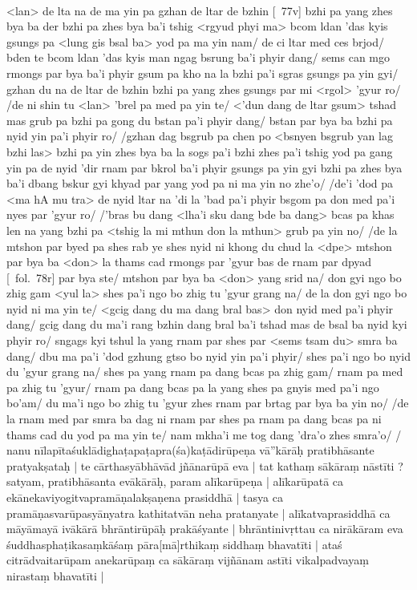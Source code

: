 \documentclass[12pt]{article}
\begin{document}
\textbf{\TVB}\\
<lan> de lta na de ma yin pa gzhan de ltar de bzhin [\TVB\ 77v] bzhi pa yang zhes bya ba der bzhi pa zhes bya ba'i tshig <rgyud phyi ma> bcom ldan 'das kyis gsungs pa <lung gis bsal ba> yod pa ma yin nam/ de ci ltar med ces brjod/ bden te bcom ldan 'das kyis man ngag bsrung ba'i phyir dang/ sems can mgo rmongs par bya ba'i phyir gsum pa kho na la bzhi pa'i sgras gsungs pa yin gyi/ gzhan du na de ltar de bzhin bzhi pa yang zhes gsungs par mi <rgol> 'gyur ro/ /de ni shin tu <lan> 'brel pa med pa yin te/ <'dun dang de ltar gsum> tshad mas grub pa bzhi pa gong du bstan pa'i phyir dang/ bstan par bya ba bzhi pa nyid yin pa'i phyir ro/ /gzhan dag bsgrub pa chen po <bsnyen bsgrub yan lag bzhi las> bzhi pa yin zhes bya ba la sogs pa'i bzhi zhes pa'i tshig yod pa gang yin pa de nyid 'dir rnam par bkrol ba'i phyir gsungs pa yin gyi bzhi pa zhes bya ba'i dbang bskur gyi khyad par yang yod pa ni ma yin no zhe'o/ /de'i 'dod pa <ma hA mu tra> de nyid ltar na 'di la 'bad pa'i phyir bsgom pa don med pa'i nyes par 'gyur ro/ /'bras bu dang <lha'i sku dang bde ba dang> bcas pa khas len na yang bzhi pa <tshig la mi mthun don la mthun> grub pa yin no/ /de la mtshon par byed pa shes rab ye shes nyid ni khong du chud la <dpe> mtshon par bya ba <don> la thams cad rmongs par 'gyur bas de rnam par dpyad [\TVB\ fol.\ 78r] par bya ste/ mtshon par bya ba <don> yang srid na/ don gyi ngo bo zhig gam <yul la> shes pa'i ngo bo zhig tu 'gyur grang na/ de la don gyi ngo bo nyid ni ma yin te/ <gcig dang du ma dang bral bas> don nyid med pa'i phyir dang/ gcig dang du ma'i rang bzhin dang bral ba'i tshad mas de bsal ba nyid kyi phyir ro/ sngags kyi tshul la yang rnam par shes par <sems tsam du> smra ba dang/ dbu ma pa'i 'dod gzhung gtso bo nyid yin pa'i phyir/ shes pa'i ngo bo nyid du 'gyur grang na/ shes pa yang rnam pa dang bcas pa zhig gam/ rnam pa med pa zhig tu 'gyur/ rnam pa dang bcas pa la yang shes pa gnyis med pa'i ngo bo'am/ du ma'i ngo bo zhig tu 'gyur zhes rnam par brtag par bya ba yin no/ /de la rnam med par smra ba dag ni rnam par shes pa rnam pa dang bcas pa ni thams cad du yod pa ma yin te/ nam mkha'i me tog dang 'dra'o zhes smra'o/ /\\

nanu nīlapītaśuklādighaṭapaṭapra(śa)kaṭādirūpeṇa vā''kārāḥ pratibhāsante pratyakṣataḥ | te cārthasyābhāvād jñānarūpā eva | tat kathaṃ sākāraṃ nāstīti ? satyam, pratibhāsanta evākārāḥ, param alīkarūpeṇa | alīkarūpatā ca ekānekaviyogitvapramāṇalakṣaṇena prasiddhā | tasya ca pramāṇasvarūpasyānyatra kathitatvān neha pratanyate | alīkatvaprasiddhā ca māyāmayā ivākārā bhrāntirūpāḥ prakāśyante | bhrāntinivṛttau ca nirākāram eva śuddhasphaṭikasaṃkāśaṃ pāra[mā]rthikaṃ siddhaṃ bhavatīti | ataś citrādvaitarūpam anekarūpaṃ ca sākāraṃ vijñānam astīti vikalpadvayaṃ nirastaṃ bhavatīti |\\
\end{document}
